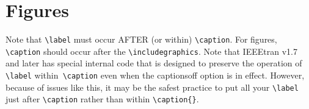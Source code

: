 \section{Figures}
Note that \verb|\label| must occur AFTER (or within) \verb|\caption|. For figures, \verb|\caption| should occur after the \verb|\includegraphics|. Note that IEEEtran v1.7 and later has special internal code that is designed to preserve the operation of \verb|\label| within\verb| \caption| even when the captionsoff option is in effect. However, because
of issues like this, it may be the safest practice to put all your \verb|\label| just after \verb|\caption| rather than within \verb|\caption{}|.
